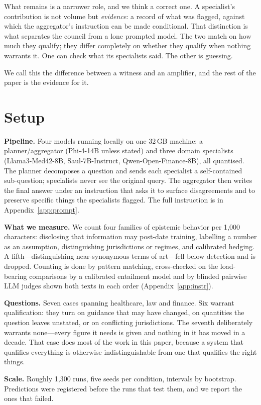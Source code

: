 \documentclass[11pt]{article}
\begin{document}
What remains is a narrower role, and we think a correct one. A specialist's
contribution is not volume but \emph{evidence}: a record of what was flagged,
against which the aggregator's instruction can be made conditional. That
distinction is what separates the council from a lone prompted model. The two
match on how much they qualify; they differ completely on whether they qualify
when nothing warrants it. One can check what its specialists said. The other
is guessing.

We call this the difference between a witness and an amplifier, and the rest
of the paper is the evidence for it.

\section{Setup}
\textbf{Pipeline.} Four models running locally on one 32\,GB machine: a
planner/aggregator (Phi-4-14B unless stated) and three domain specialists
(Llama3-Med42-8B, Saul-7B-Instruct, Qwen-Open-Finance-8B), all quantised. The
planner decomposes a question and sends each specialist a self-contained
sub-question; specialists never see the original query. The aggregator then
writes the final answer under an instruction that asks it to surface
disagreements and to preserve specific things the specialists flagged. The
full instruction is in Appendix~\ref{app:prompt}.

\textbf{What we measure.} We count four families of epistemic behavior per
1{,}000 characters: disclosing that information may post-date training,
labelling a number as an assumption, distinguishing jurisdictions or regimes,
and calibrated hedging. A fifth---distinguishing near-synonymous terms of
art---fell below detection and is dropped. Counting is done by pattern
matching, cross-checked on the load-bearing comparisons by a calibrated
entailment model and by blinded pairwise LLM judges shown both texts in each
order (Appendix~\ref{app:instr}).

\textbf{Questions.} Seven cases spanning healthcare, law and finance. Six
warrant qualification: they turn on guidance that may have changed, on
quantities the question leaves unstated, or on conflicting jurisdictions. The
seventh deliberately warrants none---every figure it needs is given and
nothing in it has moved in a decade. That case does most of the work in this
paper, because a system that qualifies everything is otherwise
indistinguishable from one that qualifies the right things.

\textbf{Scale.} Roughly 1{,}300 runs, five seeds per condition, intervals by
bootstrap. Predictions were registered before the runs that test them, and
we report the ones that failed.
\end{document}
